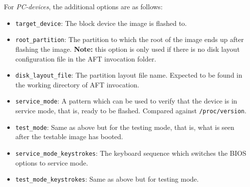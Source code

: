 \documentclass[a4paper,11pt]{article}
\newcommand{\note}{\textbf{Note: }}
\newcommand{\cmd}[1]{\texttt{#1}}
\begin{document}
For \emph{PC-devices}, the additional options are as follows:
\begin{itemize}
\item \cmd{target\_device}: The block device the image is flashed to.

\item \cmd{root\_partition}: The partition to which the root of the image ends up after flashing the image. \note this option is only used if there is no disk layout configuration file in the AFT invocation folder.

\item \cmd{disk\_layout\_file}: The partition layout file name. Expected to be found in the working directory of AFT invocation.

\item \cmd{service\_mode}: A pattern which can be used to verify that the device is in service mode, that is, ready to be flashed. Compared against \cmd{/proc/version}.

\item \cmd{test\_mode}: Same as above but for the testing mode, that is, what is seen after the testable image has booted.

\item \cmd{service\_mode\_keystrokes}: The keyboard sequence which switches the BIOS options to service mode.

\item \cmd{test\_mode\_keystrokes}: Same as above but for testing mode.
\end{itemize}
\end{document}

